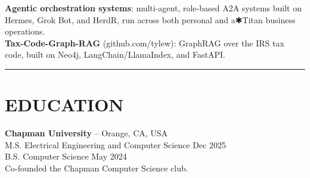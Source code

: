 \documentclass[a4paper,10pt]{article}
\begin{document}
\textbf{Agentic orchestration systems}: multi-agent, role-based A2A systems built on Hermes, Grok Bot, and HerdR, run across both personal and a{\symbolfont ✱}Titan business operations.\\[3pt]
\textbf{Tax-Code-Graph-RAG} (github.com/tylew): GraphRAG over the IRS tax code, built on Neo4j, LangChain/LlamaIndex, and FastAPI.

\noindent\rule{\textwidth}{0.4pt}

\section*{EDUCATION}
\textbf{Chapman University} – Orange, CA, USA\\
M.S. Electrical Engineering and Computer Science \hfill Dec 2025\\
B.S. Computer Science \hfill May 2024\\
Co-founded the Chapman Computer Science club.
\end{document}

